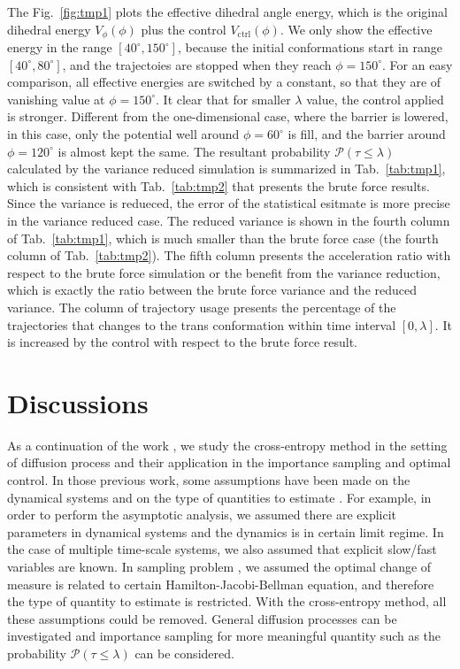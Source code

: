 \documentclass[final]{siamltex}
\begin{document}
The Fig.~\ref{fig:tmp1} plots the effective dihedral angle energy,
which is the original dihedral energy $V_\phi(\phi)$ plus the control
$V_{\textrm{ctrl}}(\phi)$. We only show the effective energy in the
range $[40^\circ, 150^\circ]$, because the initial
conformations start in range $[40^\circ, 80^\circ]$, and the
trajectoies are stopped when they reach $\phi = 150^\circ$. For an easy
comparison, all effective energies are switched by a constant, so that
they are of vanishing value at $\phi = 150^\circ$. It clear that for
smaller $\lambda$ value, the control applied is stronger. Different
from the one-dimensional case, where the barrier is lowered, in this
case, only the potential well around $\phi = 60^\circ$ is fill, and
the barrier around $\phi = 120^\circ$ is almost kept the same.  The
resultant probability $\mathcal{P} (\tau \leq \lambda)$ calculated by the
variance reduced simulation is summarized in Tab.~\ref{tab:tmp1},
which is consistent with Tab.~\ref{tab:tmp2} that presents the
brute force results. Since the variance is redueced, the error of the
statistical esitmate is more precise in the variance reduced case. The
reduced variance is shown in the fourth column of Tab.~\ref{tab:tmp1},
which is much smaller than the brute force case (the fourth column of
Tab.~\ref{tab:tmp2}). The fifth column presents the acceleration ratio
with respect to the brute force simulation or the benefit from the
variance reduction, which is exactly the ratio between the brute force
variance and the reduced variance. The column of trajectory usage
presents the percentage of the trajectories that changes to the trans
conformation within time interval $[0, \lambda]$. It is increased by
the control with respect to the brute force result.




\section{Discussions}
\label{sec-discuss}

As a continuation of the work \cite{zlph2013, zhws13}, we study the cross-entropy
method in the setting of diffusion process and their application in the
importance sampling and optimal control.
In those previous work, some assumptions have been made on the dynamical systems and
on the type of quantities to estimate \cite{zhws13}. For example, 
in order to perform the asymptotic analysis, we assumed there are explicit parameters in dynamical systems and the dynamics
is in certain limit regime. In the case of multiple time-scale systems, we
also assumed that explicit slow/fast variables are known. In sampling problem \cite{zhws13}, we assumed 
the optimal change of measure is related to certain Hamilton-Jacobi-Bellman equation,
and therefore the type of quantity to estimate is restricted. With the
cross-entropy method, all these assumptions could be removed. General
diffusion processes can be investigated and importance sampling for more
meaningful quantity such as the probability $\mathcal{P}(\tau \le \lambda)$ can be considered.
\end{document}
